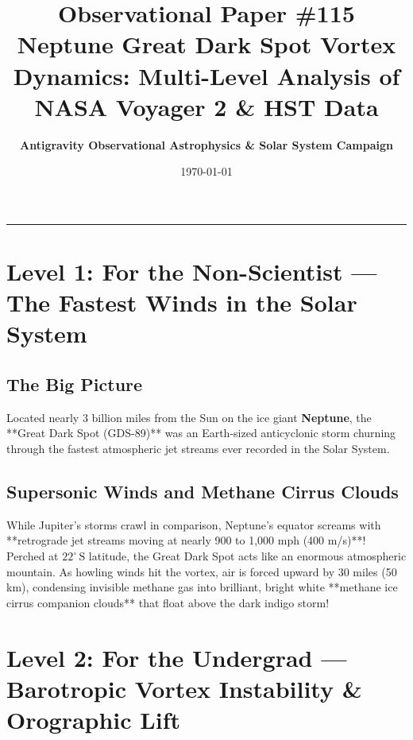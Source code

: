 \documentclass[11pt,a4paper]{article}
\title{\Huge \textbf{Observational Paper \#115}\\ \Large Neptune Great Dark Spot Vortex Dynamics: Multi-Level Analysis of NASA Voyager 2 \& HST Data}
\author{\textbf{Antigravity Observational Astrophysics \& Solar System Campaign}}
\date{\today}
\begin{document}
\maketitle

\vspace{-1em}
\begin{center}
\rule{\textwidth}{1.5pt}
\end{center}

\section*{Level 1: For the Non-Scientist — The Fastest Winds in the Solar System}

\subsection*{The Big Picture}
Located nearly 3 billion miles from the Sun on the ice giant \textbf{Neptune}, the **Great Dark Spot (GDS-89)** was an Earth-sized anticyclonic storm churning through the fastest atmospheric jet streams ever recorded in the Solar System.

\subsection*{Supersonic Winds and Methane Cirrus Clouds}
While Jupiter's storms crawl in comparison, Neptune's equator screams with **retrograde jet streams moving at nearly 900 to 1,000 mph (400 m/s)**! Perched at $22^\circ\,\text{S}$ latitude, the Great Dark Spot acts like an enormous atmospheric mountain. As howling winds hit the vortex, air is forced upward by 30 miles (50 km), condensing invisible methane gas into brilliant, bright white **methane ice cirrus companion clouds** that float above the dark indigo storm!

\newpage

\section*{Level 2: For the Undergrad — Barotropic Vortex Instability \& Orographic Lift}
\end{document}
